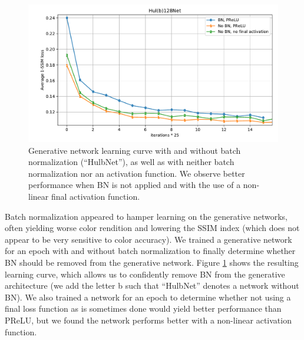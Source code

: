 \begin{figure}[!htbp]
\centering
\includegraphics[width=1\linewidth]{gfx/graphs/gen-BN.pdf}
\caption[Generative network learning curve with and without batch normalization]{Generative network learning curve with and without batch normalization (``HulbNet''), as well as with neither batch normalization nor an activation function. We observe better performance when \acl{BN} is not applied and with the use of a non-linear final activation function.}
\label{fig:gen-BN}
\end{figure}

Batch normalization appeared to hamper learning on the generative networks, often yielding worse color rendition and lowering the \ac{SSIM} index (which does not appear to be very sensitive to color accuracy). We trained a generative network for an epoch with and without batch normalization to finally determine whether \ac{BN} should be removed from the generative network. Figure \ref{fig:gen-BN} shows the resulting learning curve, which allows us to confidently remove \ac{BN} from the generative architecture (we add the letter b such that ``HulbNet'' denotes a network without \ac{BN}). We also trained a network for an epoch to determine whether not using a final loss function as is sometimes done \cite{dncnn} would yield better performance than \ac{PReLU}, but we found the network performs better with a non-linear activation function.

